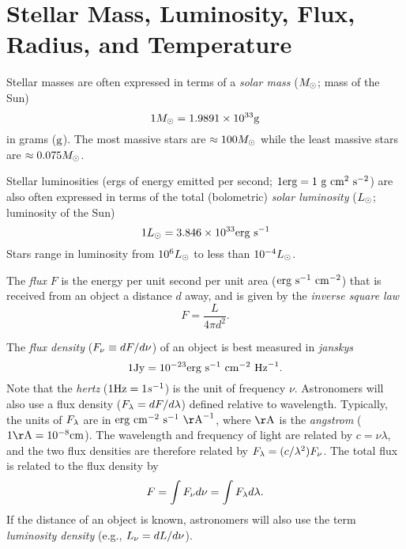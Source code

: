 \documentclass[12pt]{article}
\begin{document}
\section{Stellar Mass, Luminosity, Flux, Radius, and Temperature}
Stellar masses are often expressed in terms of a {\it solar mass} ($M_{\odot}$; mass of the Sun)
\begin{equation}
1M_{\odot} = 1.9891\times10^{33}\mathrm{g}
\end{equation}
\noindent
in grams ($\mathrm{g}$). The most massive stars are $\approx100M_{\odot}$ while the
least massive stars are $\approx0.075M_{\odot}$.

Stellar luminosities (ergs of energy emitted per second; $1\mathrm{erg} = 1~\mathrm{g}~\mathrm{cm}^{2}~\mathrm{s}^{-2}$) are also 
often expressed in terms of the total (bolometric) {\it solar luminosity} ($L_{\odot}$; luminosity of the Sun)
\begin{equation}
1L_{\odot} = 3.846\times10^{33} \mathrm{erg}~\mathrm{s}^{-1}
\end{equation}
\noindent
Stars range in luminosity from $10^{6}L_{\odot}$ to less than $10^{-4}L_{\odot}$.

The {\it flux} $F$ is the energy per unit second per unit area ($\mathrm{erg}~\mathrm{s}^{-1}~\mathrm{cm}^{-2}$)
that is received from an object a distance $d$ away, and is
given by the {\it inverse square law}
\begin{equation}
\label{eqn:inverse_square}
F = \frac{L}{4\pi d^{2}}.
\end{equation}
\noindent

The {\it flux density} ($F_{\nu} \equiv dF/d\nu$) of an object is best measured in {\it janskys}
\begin{equation}
1\mathrm{Jy} = 10^{-23} \mathrm{erg}~\mathrm{s}^{-1}~\mathrm{cm}^{-2}~\mathrm{Hz}^{-1}.
\end{equation}
\noindent
Note that the {\it hertz} ($1\mathrm{Hz} = 1 s^{-1}$) is the unit of frequency $\nu$.
Astronomers will also use a flux density ($F_{\lambda} = dF/d\lambda$) 
defined relative to wavelength. Typically, the units of $F_{\lambda}$
are in $\erg~\cm^{-2}~\s^{-1}~\Ang^{-1}$, where $\Ang$ is the {\it angstrom}
($1\Ang = 10^{-8}\cm$). The wavelength and frequency of light are related by
$c = \nu \lambda$, and the two flux densities are therefore 
related by $F_{\lambda} = (c/\lambda^2)F_{\nu}$.
The total flux is related to the flux density by
\begin{equation}
F = \int F_{\nu} d \nu = \int F_{\lambda} d\lambda.
\end{equation}
\noindent
If the distance of an object is known, astronomers will also use the term
{\it luminosity density} (e.g., $L_{\nu} = dL/d\nu$).
\end{document}
